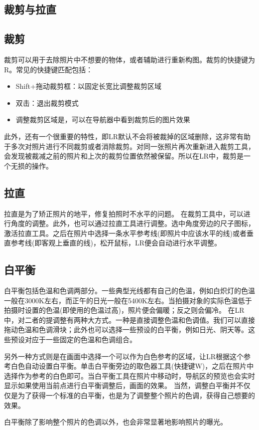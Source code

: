 \documentclass{ctexart}
\begin{document}
\subsection{裁剪与拉直}
\subsection{裁剪}
裁剪可以用于去除照片中不想要的物体，或者辅助进行重新构图。裁剪的快捷键为R。常见的快捷键匹配包括：
\begin{itemize}
    \item Shift+拖动裁剪框：以固定长宽比调整裁剪区域
    \item 双击：退出裁剪模式
    \item 调整裁剪区域是，可以在导航器中看到裁剪后的图片效果
\end{itemize}
此外，还有一个很重要的特性，即LR默认不会将被裁掉的区域删除，这非常有助于多次对照片进行不同裁剪或者消除裁剪。对同一张照片再次重新进入裁剪工具，会发现被裁减之前的照片和上次的裁剪位置依然被保留。所以在LR中，裁剪是一个无损的操作。
\subsection{拉直}
拉直是为了矫正照片的地平，修复拍照时不水平的问题。
在裁剪工具中，可以进行角度的调整。此外，也可以通过拉直工具进行调整。选中角度旁边的尺子图标，激活拉直工具。之后在照片中选择一条水平参考线(即照片中应该水平的线)或者垂直参考线(即客观上垂直的线)，松开鼠标，LR便会自动进行水平调整。
\subsection{白平衡}
白平衡包括色温和色调两部分。一些典型光线都有自己的色温，例如白炽灯的色温一般在3000K左右，而正午的日光一般在5400K左右。当拍摄对象的实际色温低于拍摄时设置的色温(即使用的色温过高)，照片便会偏暖；反之则会偏冷。
在LR中，对二者的提调整有两种大方式。一种是直接调整色温和色调值。我们可以直接拖动色温和色调滑块；此外也可以选择一些预设的白平衡，例如日光、阴天等。这些预设对应于一些固定的色温和色调组合。

另外一种方式则是在画面中选择一个可以作为白色参考的区域，让LR根据这个参考白色自动设置白平衡。单击白平衡旁边的取色器工具(快捷键W)，之后在照片中选择作为参考的白色即可。当白平衡工具在照片中移动时，导航区的预览也会实时显示如果使用当前点进行白平衡调整后，画面的效果。
当然，调整白平衡并不仅仅是为了获得一个标准的白平衡，也是为了调整整个照片的色调，获得自己想要的效果。

白平衡除了影响整个照片的色调以外，也会非常显著地影响照片的曝光。
\end{document}
